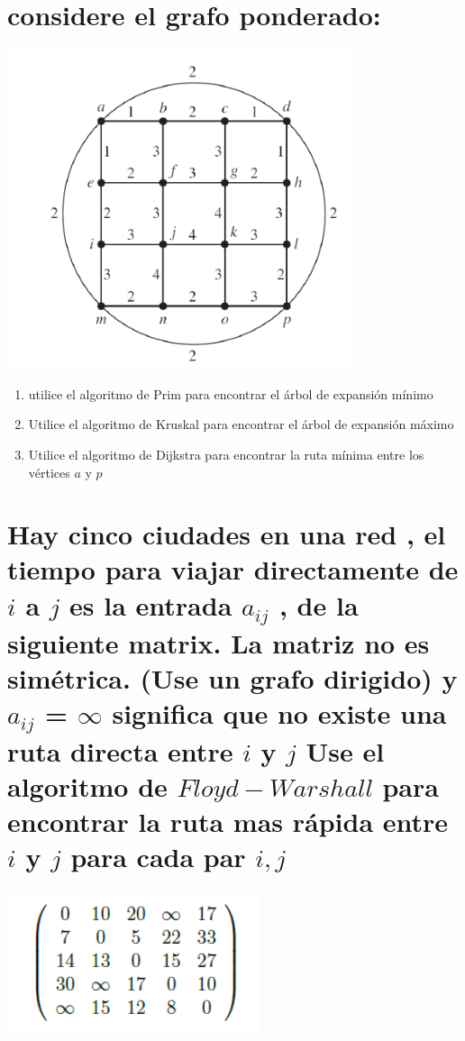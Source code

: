 \documentclass[10pt,a4paper]{article} %
\begin{document}

   \section{considere el grafo ponderado:}
        \begin{center}
            \includegraphics[width=0.4\linewidth]{grafop10}
        \end{center}
        \begin{enumerate}
            \item {utilice el algoritmo de Prim para encontrar el árbol de
                expansión mínimo}
            \item {Utilice el algoritmo de Kruskal para encontrar el árbol de expansión máximo}
            \item {Utilice el algoritmo de Dijkstra para encontrar la ruta
                mínima entre los vértices $a$ y $p$}
        \end{enumerate}




        \section{Hay cinco ciudades en una red , el tiempo para viajar
        directamente de $i$ a $j$ es la entrada $a_{ij}$ , de la siguiente
        matrix. La matriz no es simétrica. (Use un grafo dirigido) y $a_{ij}$ =
        $\infty$ significa que no existe una ruta directa entre $i$ y $j$ Use el
        algoritmo de $Floyd-Warshall$ para encontrar la ruta mas rápida entre $i$ y $j$
        para cada par $i,j$  }
            \begin{center}
                \includegraphics[width=0.4\linewidth]{matrixp11.png}
            \end{center}
\end{document}
